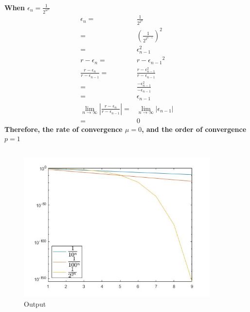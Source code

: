 \documentclass{article}
\begin{document}
                \paragraph{
                    When $\epsilon_n=\frac{1}{2^{w^n}}$
                    \begin{equation*}
                        \begin{split}
                            \epsilon_n=&\frac{1}{2^{2^n}}\\
                                =&(\frac{1}{2^{2^{n-1}}})^2\\
                                =&\epsilon_{n-1}^2\\
                            r-\epsilon_n=&r-{\epsilon_{n-1}}^2\\
                            \frac{r-\epsilon_n}{r-\epsilon_{n-1}}=&\frac{r-\epsilon_{n-1}^2}{r-\epsilon_{n-1}}\\
                                =&\frac{-\epsilon_{n-1}^2}{-\epsilon_{n-1}}\\
                                =&\epsilon_{n-1}\\
                            \lim_{n\rightarrow\infty} |\frac{r-\epsilon_n}{r-\epsilon_{n-1}}|=&\lim_{n\rightarrow\infty}|\epsilon_{n-1}|\\
                                =&0
                        \end{split}
                    \end{equation*}
                    Therefore, the rate of convergence $\mu=0$, and the order of convergence $p=1$
                }


                \subsection*{}
                
            \begin{figure}[H] 
                \centering 
                    \includegraphics[width=0.9\textwidth]{img/Assignement_2_3.jpg}
                    \caption{Output} 
            \end{figure}
   
\end{document}

